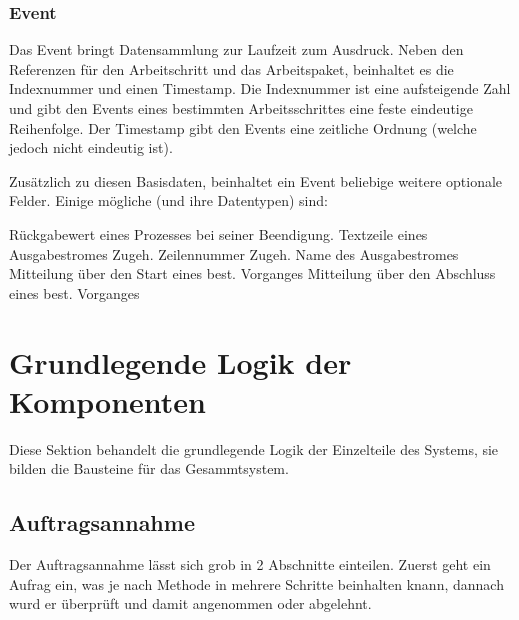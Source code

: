 

\subsubsection{Event}

Das Event bringt Datensammlung zur Laufzeit zum Ausdruck.
Neben den Referenzen f\"ur den Arbeitschritt und das Arbeitspaket,
beinhaltet es die Indexnummer und einen Timestamp.
Die Indexnummer ist eine aufsteigende Zahl
und gibt den Events eines bestimmten Arbeitsschrittes eine feste eindeutige Reihenfolge.
Der Timestamp gibt den Events eine zeitliche Ordnung (welche jedoch nicht eindeutig ist).


Zus\"atzlich zu diesen Basisdaten, beinhaltet ein Event beliebige weitere optionale Felder.
Einige m\"ogliche (und ihre Datentypen) sind:

\begin{description}
     R\"uckgabewert eines Prozesses bei seiner Beendigung.
     Textzeile eines Ausgabestromes
     Zugeh. Zeilennummer
     Zugeh. Name des Ausgabestromes
     Mitteilung \"uber den Start eines best. Vorganges
     Mitteilung \"uber den Abschluss eines best. Vorganges
\end{description}




\section{Grundlegende Logik der Komponenten}

Diese Sektion behandelt die grundlegende Logik  der Einzelteile des Systems,
sie bilden die Bausteine f\"ur das Gesammtsystem.


\subsection{Auftragsannahme}

Der Auftragsannahme l\"asst sich grob in 2 Abschnitte einteilen.
Zuerst geht ein Aufrag ein, was je nach Methode in mehrere Schritte beinhalten knann,
dannach wurd er \"uberpr\"uft und damit angenommen oder abgelehnt.


